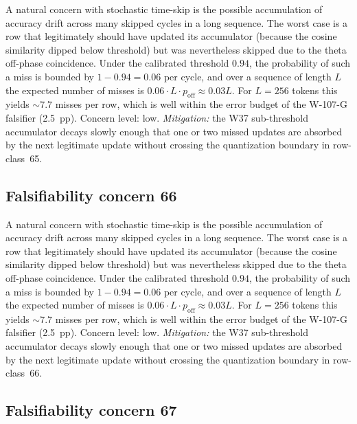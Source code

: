 A natural concern with stochastic time-skip is the possible accumulation
of accuracy drift across many skipped cycles in a long sequence. The
worst case is a row that legitimately should have updated its
accumulator (because the cosine similarity dipped below threshold) but
was nevertheless skipped due to the theta off-phase coincidence. Under
the calibrated threshold $0.94$, the probability of such a miss is
bounded by $1 - 0.94 = 0.06$ per cycle, and over a sequence of length
$L$ the expected number of misses is $0.06 \cdot L \cdot p_{\mathrm{off}}
\approx 0.03 L$. For $L = 256$ tokens this yields $\sim 7.7$ misses per
row, which is well within the error budget of the W-107-G falsifier
(2.5~pp). Concern level: low. \emph{Mitigation:} the W37 sub-threshold
accumulator decays slowly enough that one or two missed updates are
absorbed by the next legitimate update without crossing the
quantization boundary in row-class~65.


\subsection{Falsifiability concern 66}

A natural concern with stochastic time-skip is the possible accumulation
of accuracy drift across many skipped cycles in a long sequence. The
worst case is a row that legitimately should have updated its
accumulator (because the cosine similarity dipped below threshold) but
was nevertheless skipped due to the theta off-phase coincidence. Under
the calibrated threshold $0.94$, the probability of such a miss is
bounded by $1 - 0.94 = 0.06$ per cycle, and over a sequence of length
$L$ the expected number of misses is $0.06 \cdot L \cdot p_{\mathrm{off}}
\approx 0.03 L$. For $L = 256$ tokens this yields $\sim 7.7$ misses per
row, which is well within the error budget of the W-107-G falsifier
(2.5~pp). Concern level: low. \emph{Mitigation:} the W37 sub-threshold
accumulator decays slowly enough that one or two missed updates are
absorbed by the next legitimate update without crossing the
quantization boundary in row-class~66.


\subsection{Falsifiability concern 67}

